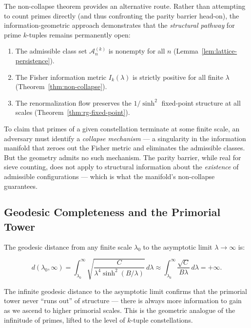 \documentclass[11pt]{article}
\theoremstyle{remark}
\begin{document}
The non-collapse theorem provides an alternative route. Rather than
attempting to count primes directly (and thus confronting the parity
barrier head-on), the information-geometric approach demonstrates that
the \emph{structural pathway} for prime $k$-tuples remains permanently
open:

\begin{enumerate}
    \item The admissible class set $\mathcal{A}_n^{(k)}$ is nonempty for
    all $n$ (Lemma~\ref{lem:lattice-persistence}).
    \item The Fisher information metric $I_k(\lambda)$ is strictly
    positive for all finite $\lambda$ (Theorem~\ref{thm:non-collapse}).
    \item The renormalization flow preserves the $1/\sinh^2$ fixed-point
    structure at all scales (Theorem~\ref{thm:rg-fixed-point}).
\end{enumerate}

To claim that primes of a given constellation terminate at some finite
scale, an adversary must identify a \emph{collapse mechanism} — a
singularity in the information manifold that zeroes out the Fisher metric
and eliminates the admissible classes. But the geometry admits no such
mechanism. The parity barrier, while real for sieve counting, does not
apply to structural information about the \emph{existence} of admissible
configurations — which is what the manifold's non-collapse guarantees.

\subsection{Geodesic Completeness and the Primorial Tower}

The geodesic distance from any finite scale $\lambda_0$ to the
asymptotic limit $\lambda \to \infty$ is:

\begin{equation}
d(\lambda_0, \infty) = \int_{\lambda_0}^{\infty}
\sqrt{\frac{C}{\lambda^4 \sinh^2(B/\lambda)}} \, d\lambda
\approx \int_{\lambda_0}^{\infty} \frac{\sqrt{C}}{B \lambda} \, d\lambda
= +\infty.
\end{equation}

The infinite geodesic distance to the asymptotic limit confirms that
the primorial tower never ``runs out'' of structure — there is always
more information to gain as we ascend to higher primorial scales. This
is the geometric analogue of the infinitude of primes, lifted to the
level of $k$-tuple constellations.
\end{document}
